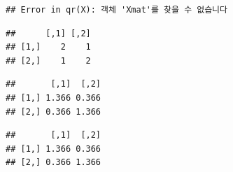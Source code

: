 \documentclass[11pt,]{krantz}
\makeatletter
\newenvironment{Shaded}{\begin{snugshade}}{\end{snugshade}}
\newcommand{\KeywordTok}[1]{\textcolor[rgb]{0.13,0.29,0.53}{\textbf{#1}}}
\newcommand{\DataTypeTok}[1]{\textcolor[rgb]{0.13,0.29,0.53}{#1}}
\newcommand{\DecValTok}[1]{\textcolor[rgb]{0.00,0.00,0.81}{#1}}
\newcommand{\FloatTok}[1]{\textcolor[rgb]{0.00,0.00,0.81}{#1}}
\newcommand{\StringTok}[1]{\textcolor[rgb]{0.31,0.60,0.02}{#1}}
\newcommand{\ControlFlowTok}[1]{\textcolor[rgb]{0.13,0.29,0.53}{\textbf{#1}}}
\newcommand{\OperatorTok}[1]{\textcolor[rgb]{0.81,0.36,0.00}{\textbf{#1}}}
\newcommand{\NormalTok}[1]{#1}
\newenvironment{kframe}{%
\medskip{}
\setlength{\fboxsep}{.8em}
 \def\at@end@of@kframe{}%
 \ifinner\ifhmode%
  \def\at@end@of@kframe{\end{minipage}}%
  \begin{minipage}{\columnwidth}%
 \fi\fi%
 \def\FrameCommand##1{\hskip\@totalleftmargin \hskip-\fboxsep
 \colorbox{shadecolor}{##1}\hskip-\fboxsep
     \hskip-\linewidth \hskip-\@totalleftmargin \hskip\columnwidth}%
 \MakeFramed {\advance\hsize-\width
   \@totalleftmargin\z@ \linewidth\hsize
   \@setminipage}}%
 {\par\unskip\endMakeFramed%
 \at@end@of@kframe}
\renewenvironment{Shaded}{\begin{kframe}}{\end{kframe}}
\theoremstyle{definition}
\theoremstyle{definition}
\theoremstyle{remark}
\makeatother
\begin{document}
\begin{verbatim}
## Error in qr(X): 객체 'Xmat'를 찾을 수 없습니다
\end{verbatim}

\begin{Shaded}
\end{Shaded}

\begin{verbatim}
##      [,1] [,2]
## [1,]    2    1
## [2,]    1    2
\end{verbatim}

\begin{Shaded}
\end{Shaded}

\begin{verbatim}
##       [,1]  [,2]
## [1,] 1.366 0.366
## [2,] 0.366 1.366
\end{verbatim}

\begin{Shaded}
\end{Shaded}

\begin{verbatim}
##       [,1]  [,2]
## [1,] 1.366 0.366
## [2,] 0.366 1.366
\end{verbatim}

\begin{Shaded}
\end{Shaded}
\end{document}
